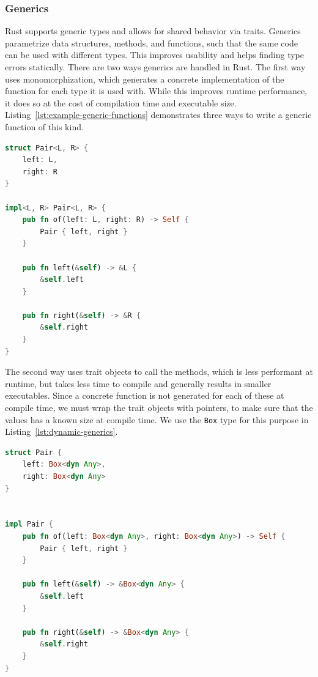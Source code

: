 \documentclass{article}
\begin{document}
\subsubsection{Generics}
Rust supports generic types and allows for shared behavior via traits. Generics parametrize data structures, methods, and functions, such that the same code can be used with different types. This improves usability and helps finding type errors statically. There are two ways generics are handled in Rust. The first way uses monomorphization, which generates a concrete implementation of the function for each type it is used with. While this improves runtime performance, it does so at the cost of compilation time and executable size. Listing~\ref{lst:example-generic-functions} demonstrates three ways to write a generic function of this kind.

\begin{lstlisting}[language=Rust, style=boxed, caption=Variants of defining a generic function, label=lst:static-generics]
struct Pair<L, R> {
    left: L,
    right: R
}

impl<L, R> Pair<L, R> {
    pub fn of(left: L, right: R) -> Self {
        Pair { left, right }
    }

    pub fn left(&self) -> &L {
        &self.left
    }

    pub fn right(&self) -> &R {
        &self.right
    }
}
\end{lstlisting}

The second way uses trait objects to call the methods, which is less performant at runtime, but takes less time to compile and generally results in smaller executables. Since a concrete function is not generated for each of these at compile time, we must wrap the trait objects with pointers, to make sure that the values has a known size at compile time. We use the \lstinline{Box} type for this purpose in Listing~\ref{lst:dynamic-generics}.

\begin{lstlisting}[language=Rust, style=boxed, caption=A function which will remain generic at runtime. It can be rewritten in the same stly as the other two variants in Listing~\ref{lst:example-generic-functions}, label=lst:dynamic-generics]
struct Pair {
    left: Box<dyn Any>,
    right: Box<dyn Any>
}


impl Pair {
    pub fn of(left: Box<dyn Any>, right: Box<dyn Any>) -> Self {
        Pair { left, right }
    }

    pub fn left(&self) -> &Box<dyn Any> {
        &self.left
    }

    pub fn right(&self) -> &Box<dyn Any> {
        &self.right
    }
}
\end{lstlisting}
\end{document}

